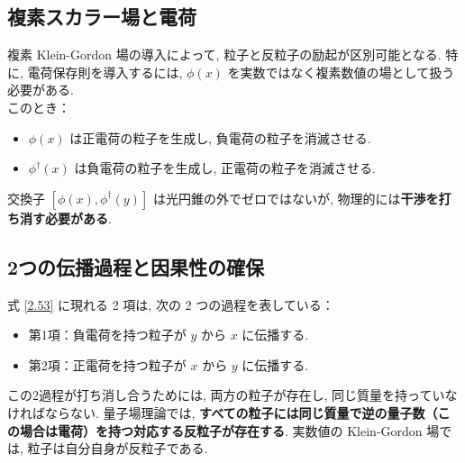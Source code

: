 \documentclass[a4paper,12pt]{article}
\begin{document}
\subsection*{複素スカラー場と電荷}
複素 Klein-Gordon 場の導入によって, 粒子と反粒子の励起が区別可能となる. 特に, 電荷保存則を導入するには, $\phi(x)$ を実数ではなく複素数値の場として扱う必要がある.\\
このとき：
\begin{itemize}
  \item $\phi(x)$ は正電荷の粒子を生成し, 負電荷の粒子を消滅させる.
  \item $\phi^\dagger(x)$ は負電荷の粒子を生成し, 正電荷の粒子を消滅させる.
\end{itemize}
交換子 $[\phi(x), \phi^\dagger(y)]$ は光円錐の外でゼロではないが, 物理的には\textbf{干渉を打ち消す必要がある}.
\subsection*{2つの伝播過程と因果性の確保}
式 \eqref{2.53} に現れる 2 項は, 次の 2 つの過程を表している：
\begin{itemize}
  \item 第1項：負電荷を持つ粒子が $y$ から $x$ に伝播する.
  \item 第2項：正電荷を持つ粒子が $x$ から $y$ に伝播する.
\end{itemize}
この2過程が打ち消し合うためには, 両方の粒子が存在し, 同じ質量を持っていなければならない. 量子場理論では, \textbf{すべての粒子には同じ質量で逆の量子数（この場合は電荷）を持つ対応する反粒子が存在する}. 実数値の Klein-Gordon 場では, 粒子は自分自身が反粒子である.
\end{document}
